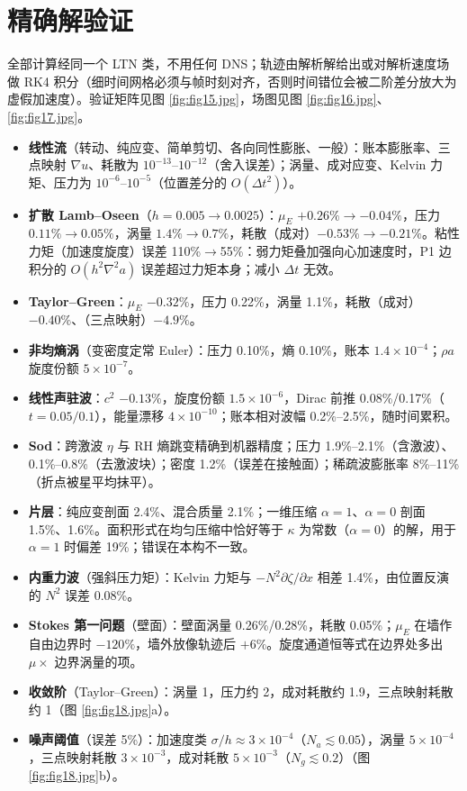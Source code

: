 \documentclass[11pt,a4paper]{article}
\begin{document}
\section{精确解验证}\label{sec:exact}
全部计算经同一个 LTN 类，不用任何 DNS；轨迹由解析解给出或对解析速度场做 RK4 积分（细时间网格必须与帧时刻对齐，否则时间错位会被二阶差分放大为虚假加速度）。验证矩阵见图 \ref{fig:fig15.jpg}，场图见图 \ref{fig:fig16.jpg}、\ref{fig:fig17.jpg}。
\begin{itemize}
\item \textbf{线性流}（转动、纯应变、简单剪切、各向同性膨胀、一般）：账本膨胀率、三点映射 $\nabla u$、耗散为 $10^{-13}$–$10^{-12}$（舍入误差）；涡量、成对应变、Kelvin 力矩、压力为 $10^{-6}$–$10^{-5}$（位置差分的 $O(\Delta t^2)$）。
\item \textbf{扩散 Lamb–Oseen}（$h=0.005\to0.0025$）：$\mu_E$ $+0.26\%\to-0.04\%$，压力 $0.11\%\to0.05\%$，涡量 $1.4\%\to0.7\%$，耗散（成对）$-0.53\%\to-0.21\%$。粘性力矩（加速度旋度）误差 110\%$\to$55\%：弱力矩叠加强向心加速度时，P1 边积分的 $O(h^2\nabla^2a)$ 误差超过力矩本身；减小 $\Delta t$ 无效。
\item \textbf{Taylor–Green}：$\mu_E$ $-0.32\%$，压力 0.22\%，涡量 1.1\%，耗散（成对）$-0.40\%$、（三点映射）$-4.9\%$。
\item \textbf{非均熵涡}（变密度定常 Euler）：压力 0.10\%，熵 0.10\%，账本 $1.4\times10^{-4}$；$\rho a$ 旋度份额 $5\times10^{-7}$。
\item \textbf{线性声驻波}：$c^2$ $-0.13\%$，旋度份额 $1.5\times10^{-6}$，Dirac 前推 0.08\%/0.17\%（$t=0.05/0.1$），能量漂移 $4\times10^{-10}$；账本相对波幅 0.2\%–2.5\%，随时间累积。
\item \textbf{Sod}：跨激波 $\eta$ 与 RH 熵跳变精确到机器精度；压力 1.9\%–2.1\%（含激波）、0.1\%–0.8\%（去激波块）；密度 1.2\%（误差在接触面）；稀疏波膨胀率 8\%–11\%（折点被星平均抹平）。
\item \textbf{片层}：纯应变剖面 2.4\%、混合质量 2.1\%；一维压缩 $\alpha=1$、$\alpha=0$ 剖面 1.5\%、1.6\%。面积形式在均匀压缩中恰好等于 $\kappa$ 为常数（$\alpha=0$）的解，用于 $\alpha=1$ 时偏差 19\%；错误在本构不一致。
\item \textbf{内重力波}（强斜压力矩）：Kelvin 力矩与 $-N^2\partial\zeta/\partial x$ 相差 1.4\%，由位置反演的 $N^2$ 误差 0.08\%。
\item \textbf{Stokes 第一问题}（壁面）：壁面涡量 0.26\%/0.28\%，耗散 0.05\%；$\mu_E$ 在墙作自由边界时 $-120\%$，墙外放像轨迹后 $+6\%$。旋度通道恒等式在边界处多出 $\mu\times$ 边界涡量的项。
\item \textbf{收敛阶}（Taylor–Green）：涡量 1，压力约 2，成对耗散约 1.9，三点映射耗散约 1（图 \ref{fig:fig18.jpg}a）。
\item \textbf{噪声阈值}（误差 5\%）：加速度类 $\sigma/h\approx3\times10^{-4}$（$N_a\lesssim0.05$），涡量 $5\times10^{-4}$，三点映射耗散 $3\times10^{-3}$，成对耗散 $5\times10^{-3}$（$N_g\lesssim0.2$）（图 \ref{fig:fig18.jpg}b）。
\end{itemize}
\end{document}
